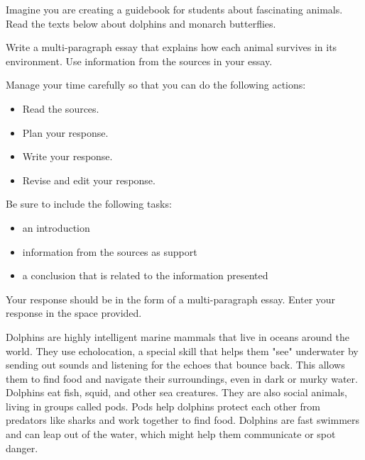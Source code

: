 \documentclass[12pt]{article}
\begin{document}
\vspace{1em}

\begin{tcolorbox}[colframe=black!60, colback=white, 
coltitle=black, colbacktitle=black!15, fonttitle=\bfseries\Large, 
title=Example Test Prompt, halign title=center, left=10pt, right=10pt, top=10pt, bottom=15pt]
Imagine you are creating a guidebook for students about  fascinating animals. Read the texts below about dolphins and monarch butterflies.

 \vspace{1em}

Write a multi-paragraph essay that explains how each animal survives in its environment. Use information from the sources in your essay.

\vspace{1em}

Manage your time carefully so that you can do the following actions:
\begin{itemize}
    \item Read the sources.
    \item Plan your response.
    \item Write your response.
    \item Revise and edit your response.

\end{itemize}
Be sure to include the following tasks:
\begin{itemize}
    \item an introduction
    \item information from the sources as support
    \item a conclusion that is related to the information presented

\end{itemize}
Your response should be in the form of a multi-paragraph essay. Enter your response in the space provided.
     \end{tcolorbox}

\vspace{1em}

\begin{tcolorbox}[colframe=black!60, colback=white, 
coltitle=black, colbacktitle=black!15, fonttitle=\bfseries\Large, 
title=Source 1: Dolphins, halign title=center, left=10pt, right=10pt, top=10pt, bottom=15pt]
Dolphins are highly intelligent marine mammals that live in oceans around the world. They use echolocation, a special skill that helps them "see" underwater by sending out sounds and listening for the echoes that bounce back. This allows them to find food and navigate their surroundings, even in dark or murky water. Dolphins eat fish, squid, and other sea creatures. They are also social animals, living in groups called pods. Pods help dolphins protect each other from predators like sharks and work together to find food. Dolphins are fast swimmers and can leap out of the water, which might help them communicate or spot danger.

 
 



     \end{tcolorbox}
\end{document}
